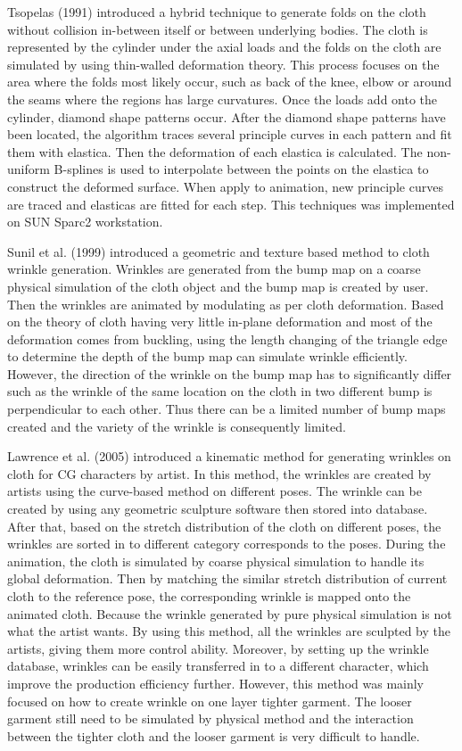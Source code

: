 Tsopelas  (1991) introduced a hybrid technique to generate folds on the cloth without collision in-between itself or between underlying bodies. The cloth is represented by the cylinder under the axial loads and the folds on the cloth are simulated by using thin-walled deformation theory. This process focuses on the area where the folds most likely occur, such as back of the knee, elbow or around the seams where the regions has large curvatures. Once the loads add onto the cylinder, diamond shape patterns occur. After the diamond shape patterns have been located, the algorithm traces several principle curves in each pattern and fit them with elastica. Then the deformation of each elastica is calculated. The non-uniform B-splines is used to interpolate between the points on the elastica to construct the deformed surface. When apply to animation, new principle curves are traced and elasticas are fitted for each step. This techniques was implemented on SUN Sparc2 workstation.

Sunil et al. (1999) introduced a geometric and texture based method to cloth wrinkle generation. Wrinkles are generated from the bump map on a coarse physical simulation of the cloth object and the bump map is created by user. Then the wrinkles are animated by modulating as per cloth deformation. Based on the theory of cloth having very little in-plane deformation and most of the deformation comes from buckling, using the length changing of the triangle edge to determine the depth of the bump map can simulate wrinkle efficiently. However, the direction of the wrinkle on the bump map has to significantly differ such as the wrinkle of the same location on the cloth in two different bump is perpendicular to each other. Thus there can be a limited number of bump maps created and the variety of the wrinkle is consequently limited.

Lawrence et al. (2005) introduced a kinematic method for generating wrinkles on cloth for CG characters by artist. In this method, the wrinkles are created by artists using the curve-based method on different poses. The wrinkle can be created by using any geometric sculpture software then stored into database. After that, based on the stretch distribution of the cloth on different poses, the wrinkles are sorted in to different category corresponds to the poses. During the animation, the cloth is simulated by coarse physical simulation to handle its global deformation. Then by matching the similar stretch distribution of current cloth to the reference pose, the corresponding wrinkle is mapped onto the animated cloth. Because the wrinkle generated by pure physical simulation is not what the artist wants. By using this method, all the wrinkles are sculpted by the artists, giving them more control ability. Moreover, by setting up the wrinkle database, wrinkles can be easily transferred in to a different character, which improve the production efficiency further. However, this method was mainly focused on how to create wrinkle on one layer tighter garment. The looser garment still need to be simulated by physical method and the interaction between the tighter cloth and the looser garment is very difficult to handle.

